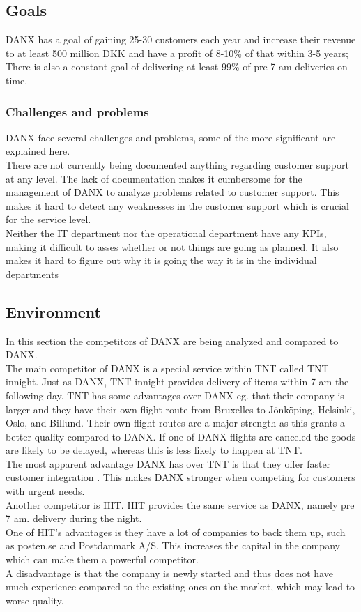 \subsection{Goals}
DANX has a goal of gaining 25-30 customers each year and increase their revenue to at least 500 million DKK and have a profit of 8-10\% of that within 3-5 years;
There is also a constant goal of delivering at least 99\% of pre 7 am deliveries on time\cite{mail}.

\subsubsection{Challenges and problems}
DANX face several challenges and problems, some of the more significant are explained here. \\
There are not currently being documented anything regarding customer support at any level\cite{lasse010}. The lack of documentation makes it cumbersome for the management of DANX to analyze problems related to customer support. This makes it hard to detect any weaknesses in the customer support which is crucial for the service level. \\
Neither the IT department nor the operational department have any KPIs\cite{gert011}, making it difficult to asses whether or not things are going as planned. It also makes it hard to figure out why it is going the way it is in the individual departments

\subsection{Environment}
In this section the competitors of DANX are being analyzed and compared to DANX. \\
The main competitor of DANX is a special service within TNT called TNT innight. Just as DANX, TNT innight provides delivery of items within 7 am the following day.\cite{webpage001} TNT has some advantages over DANX eg. that their company is larger\cite{tnt002} and they have their own flight route\cite{webpage001} from Bruxelles to Jönköping, Helsinki, Oslo, and Billund.
Their own flight routes are a major strength as this grants a better quality compared to DANX. If one of DANX flights are canceled the goods are likely to be delayed, whereas this is less likely to happen at TNT. \\
The most apparent advantage DANX has over TNT is that they offer faster customer integration\cite{tnt001} \cite{lasse008}. This makes DANX stronger when competing for customers with urgent needs. \\
Another competitor is HIT\cite{malene001}. HIT provides the same service as DANX, namely pre 7 am. delivery during the night. \\
One of HIT’s advantages is they have a lot of companies to back them up, such as posten.se and Postdanmark A/S.\cite{webpage002}\cite{webpage012} This increases the capital in the company which can make them a powerful competitor. \\
A disadvantage is that the company is newly started and thus does not have much experience compared to the existing ones on the market, which may lead to worse quality.

